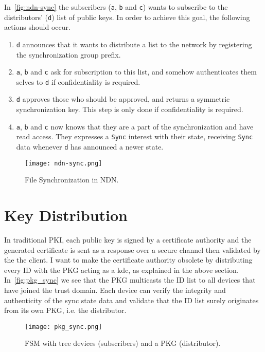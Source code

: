 In~\autoref{fig:ndn-sync} the subscribers (\texttt{a}, \texttt{b} and \texttt{c}) wants to subscribe to the distributors' (\texttt{d}) list of public keys.
In order to achieve this goal, the following actions should occur.
\begin{enumerate}
	\item \texttt{d} announces that it wants to distribute a list to the network by registering the synchronization group prefix. 
	\item \texttt{a}, \texttt{b} and \texttt{c} ask for subscription to this list, and somehow authenticates them selves to \texttt{d} if confidentiality is required.
	\item \texttt{d} approves those who should be approved, and returns a symmetric synchronization key. 
	This step is only done if confidentiality is required.
	\item \texttt{a}, \texttt{b} and \texttt{c} now knows that they are a part of the synchronization and have read access. They expresses a \texttt{Sync} \gls{interest} with their state, receiving \texttt{Sync} \gls{data} whenever \texttt{d} has announced a newer state.
\end{enumerate}

\begin{figure}[ht]
  \centering
  \texttt{[image: ndn-sync.png]}
  \caption[File Synchronization in NDN]{File Synchronization in NDN.}
  \label{fig:ndn-sync}
\end{figure}

\section{Key Distribution}\label{key-distribution}
In traditional \gls{PKI}, each public key is signed by a certificate authority and the generated certificate is sent as a response over a secure channel then validated by the the client.
I want to make the certificate authority obsolete by distributing every \gls{ID} with the \gls{PKG} acting as a \gls{kdc}, as explained in the above section.
In~\autoref{fig:pkg_sync} we see that the \gls{PKG} multicasts the \gls{ID} list to all devices that have joined the trust domain.
Each device can verify the integrity and authenticity of the sync state \gls{data} and validate that the \gls{ID} list surely originates from its own \gls{PKG}, i.e. the distributor.
\begin{figure}[ht]
  \centering
  \texttt{[image: pkg\_sync.png]}
  \caption[File Synchronization Module]{FSM with tree devices (subscribers) and a PKG (distributor).}
  \label{fig:pkg_sync}
\end{figure}


